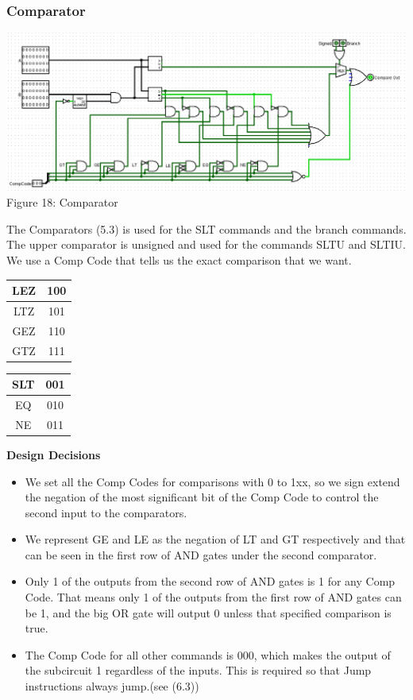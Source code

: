 \documentclass{article}
\begin{document}
\subsubsection{Comparator}
\begin{center}
\includegraphics[width=.9\textwidth]{Compare.png}\\
Figure 18: Comparator
\end{center}
The Comparators (5.3) is used for the SLT commands and the branch commands. The upper comparator is unsigned and used for the commands SLTU and SLTIU. \\
We use a Comp Code that tells us the exact comparison that we want. \\
\begin{center}
\begin{tabular}{| c | c |}
\hline 
LEZ & 100 \\ \hline
LTZ & 101 \\ \hline
GEZ & 110 \\ \hline
GTZ & 111 \\ \hline
\end{tabular} \hspace{4cm}
\begin{tabular}{| c | c |}
\hline 
SLT & 001 \\ \hline
EQ &  010 \\ \hline
NE &  011 \\ \hline
\end{tabular}
\end{center}

\textbf{Design Decisions}
\begin{itemize}
\item
We set all the Comp Codes for comparisons with 0 to 1xx, so we sign extend the negation of the most significant bit of the Comp Code to control the second input to the comparators. 
\item
We represent GE and LE as the negation of LT and GT respectively and that can be seen in the first row of AND gates under the second comparator.
\item
Only 1 of the outputs from the second row of AND gates is 1 for any Comp Code. That means only 1 of the outputs from the first row of AND gates can be 1, and the big OR gate will output 0 unless that specified comparison is true. 
\item
The Comp Code for all other commands is 000, which makes the output of the subcircuit 1 regardless of the inputs. This is required so that Jump instructions always jump.(see (6.3))
\end{itemize}
\end{document}
